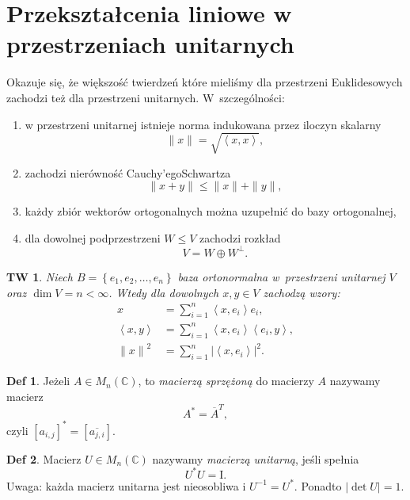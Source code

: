 \documentclass[a4paper, 12pt]{mwart}
\newcommand*{\im}{\mathrm{I}}
\theoremstyle{definition}
\newtheorem{definicja}{Def}[section]
\theoremstyle{plain}
\newtheorem{twierdzenie}{TW}[section]
\theoremstyle{remark}
\begin{document}
\section{Przekształcenia liniowe w przestrzeniach unitarnych}
Okazuje się, że większość twierdzeń które mieliśmy dla przestrzeni Euklidesowych zachodzi też dla przestrzeni unitarnych. W~szczególności:
\begin{enumerate}
	\item w przestrzeni unitarnej istnieje norma indukowana przez iloczyn skalarny
	\begin{equation}
		\|x\| = \sqrt{\left<x, x\right>},
	\end{equation}
	\item zachodzi nierówność Cauchy'ego\ppauza Schwartza
	\begin{equation}
		\|x+y\| \leq \|x\| + \|y\|,
	\end{equation}
	\item każdy zbiór wektorów ortogonalnych można uzupełnić do bazy ortogonalnej,
	\item dla dowolnej podprzestrzeni $W\leq V$ zachodzi rozkład
	\begin{equation}
		V = W \oplus W^\perp.
	\end{equation}
\end{enumerate}
\begin{twierdzenie}
	Niech $B = \left\{e_1, e_2, \ldots, e_n\right\}$ \ppauza baza ortonormalna w~przestrzeni unitarnej $V$ oraz $\dim V = n < \infty$. Wtedy dla dowolnych $x, y\in V$ zachodzą wzory:
	\begin{align}
		x &= \sum_{i = 1}^n \left<x, e_i\right>e_i,\\
		\left<x, y\right> &= \sum_{i = 1}^n \left<x, e_i\right>\left<e_i, y\right>, \\
		{\|x\|}^2 &= \sum_{i = 1}^n {|\left<x, e_i\right>|}^2.
	\end{align}
\end{twierdzenie}
\begin{definicja}
	Jeżeli $A\in M_n(\mathbb{C})$, to \emph{macierzą sprzężoną} do macierzy $A$ nazywamy macierz
	\begin{equation}
		A^* = {\overline A}^T,
	\end{equation}
	czyli $[a_{i, j}]^* = [\overline{a_{j, i}}]$.
\end{definicja}
\begin{definicja}
	Macierz $U\in M_n(\mathbb{C})$ nazywamy \emph{macierzą unitarną}, jeśli spełnia
	\begin{equation}
		U^*U = \im.
	\end{equation}
	Uwaga: każda macierz unitarna jest nieosobliwa i $U^{-1} = U^*$. Ponadto $|\det U | = 1$.
\end{definicja}
\end{document}
